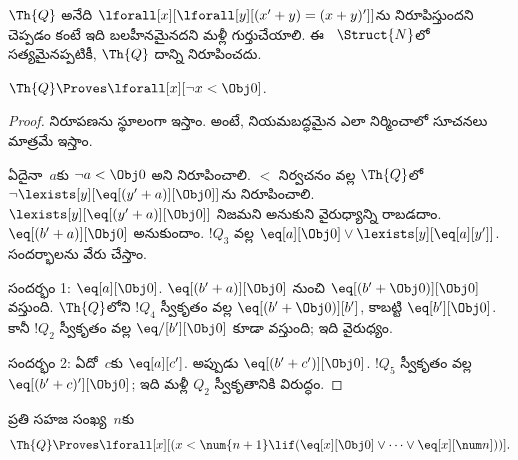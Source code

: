 \documentclass[../../../include/open-logic-section]{subfiles}
\begin{document}
$\Th{Q}$ అనేది $\lforall[x][\lforall[y][(x'+y)=(x+y)']]$ను
నిరూపిస్తుందని చెప్పడం కంటే ఇది బలహీనమైనదని మళ్లీ గుర్తుచేయాలి. ఈ
~$\Struct{N}$లో సత్యమైనప్పటికీ, $\Th{Q}$ దాన్ని నిరూపించదు.

\begin{lem}
$\Th{Q} \Proves \lforall[x][\lnot x < \Obj 0]$.
\end{lem}

\begin{proof}
నిరూపణను స్థూలంగా ఇస్తాం. అంటే, నియమబద్ధమైన  ఎలా
నిర్మించాలో సూచనలు మాత్రమే ఇస్తాం.

ఏదైనా~$a$కు $\lnot a<\Obj 0$ అని నిరూపించాలి. $<$ నిర్వచనం వల్ల
$\Th{Q}$లో $\lnot\lexists[y][\eq[(y'+a)][\Obj 0]]$ను నిరూపించాలి.
$\lexists[y][\eq[(y'+a)][\Obj 0]]$ నిజమని అనుకుని వైరుధ్యాన్ని రాబడదాం.
$\eq[(b'+a)][\Obj 0]$ అనుకుందాం. $!Q_3$ వల్ల
$\eq[a][\Obj 0]\lor\lexists[y][\eq[a][y']]$. సందర్భాలను వేరు చేస్తాం.

సందర్భం 1: $\eq[a][\Obj 0]$. $\eq[(b'+a)][\Obj 0]$ నుంచి
$\eq[(b'+\Obj 0)][\Obj 0]$ వస్తుంది. $\Th{Q}$లోని $!Q_4$ స్వీకృతం వల్ల
$\eq[(b'+\Obj 0)][b']$, కాబట్టి $\eq[b'][\Obj 0]$. కానీ $!Q_2$ స్వీకృతం
వల్ల $\eq/[b'][\Obj 0]$ కూడా వస్తుంది; ఇది వైరుధ్యం.

సందర్భం 2: ఏదో~$c$కు $\eq[a][c']$. అప్పుడు
$\eq[(b'+c')][\Obj 0]$. $!Q_5$ స్వీకృతం వల్ల
$\eq[(b'+c)'][\Obj 0]$; ఇది మళ్లీ $Q_2$ స్వీకృతానికి విరుద్ధం.
\end{proof}

\begin{lem}
ప్రతి సహజ సంఖ్య~$n$కు
\[
  \Th{Q} \Proves
  \lforall[x][(x < \num {n+1} \lif (\eq[x][\Obj 0] \lor \dots \lor
    \eq[x][\num n]))].
\]
\end{lem}
\end{document}
